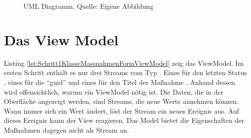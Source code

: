 \ifIncludeFigures
  \begin{figure}[h]
    \centering


    \caption[UML Diagramm]{UML Diagramm, Quelle: Eigene Abbildung}
    \label{lst:UmlOnSelet}

  \end{figure}%
\fi







\section{ Das View Model }

Listing \ref{lst:Schritt1KlasseMassnahmenFormViewModel} zeig das ViewModel.
Im ersten Schritt enthält es nur drei Streams vom Typ .
Eines für den letzten Status , eines für die \enquote{guid}  und eines für den Titel der Maßnahme .
Anhand dessen wird offensichtlich, warum ein ViewModel nötig ist.
Die Daten, die in der Oberfläche angezeigt werden, sind Streams, die neue Werte annehmen können.
Wann immer sich ein Wert ändert, löst der Stream ein neues Ereignis aus.
Auf dieses Ereignis kann der View reagieren.
Das Model bietet die Eigenschaften der Maßnahmen dagegen nicht als Stream an.

